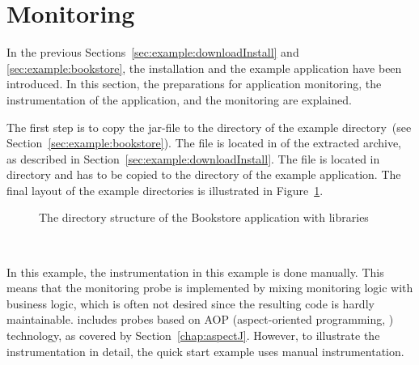 \section{Monitoring}\label{sec:example:monitoring}

In the previous Sections~\ref{sec:example:downloadInstall} and \ref{sec:example:bookstore}, the \Kieker{} installation and the example application have been introduced. In this section, the preparations for application monitoring, the instrumentation of the application, and the monitoring are explained.

The first step is to copy the \Kieker{} jar-file \file{\mainJar} to the  directory of the example directory~(see Section~\ref{sec:example:bookstore}). The file is located in  of the extracted \Kieker{} archive, as described in Section~\ref{sec:example:downloadInstall}. %
The file \file{\commonsLoggingJar} is located in  directory and has to be copied to the  directory of the example application. The final layout of the example directories is illustrated in Figure~\ref{fig:KiekerBookstoreExample}.

\begin{figure}[H]
\begin{graybox}
\end{graybox}
\caption{The directory structure of the Bookstore application with \Kieker{} libraries}
\label{fig:KiekerBookstoreExample}
\end{figure}


\quad\

\noindent In this example, the instrumentation in this example is done manually. %
This means that the monitoring probe is implemented by mixing monitoring logic %
with business logic, which is often not desired since the resulting code is %
hardly maintainable. \Kieker{} includes probes %
based on AOP (aspect-oriented programming, \cite{Kiczales1997}) %
technology, as covered by Section~\ref{chap:aspectJ}. However, to illustrate the %
instrumentation in detail, the quick start example uses manual instrumentation.

